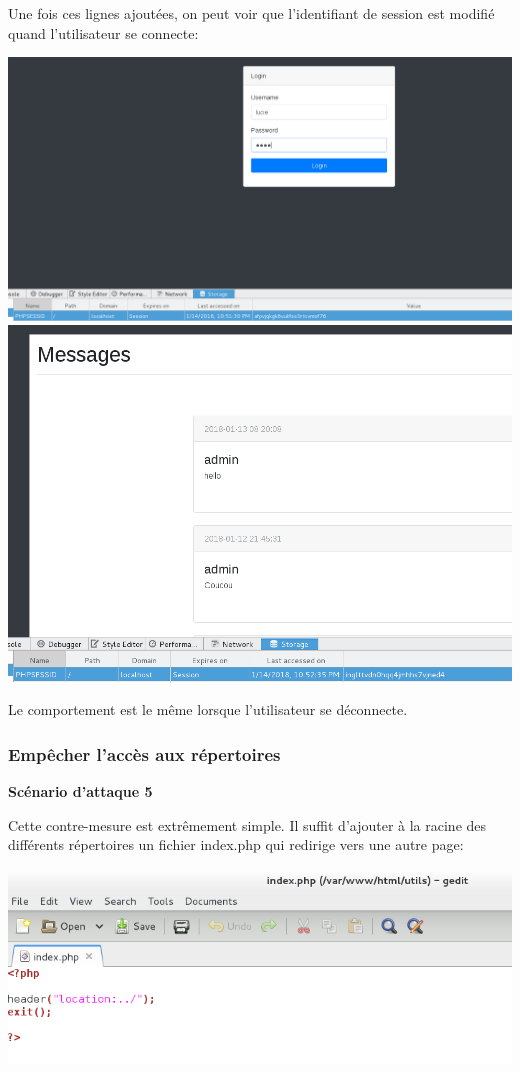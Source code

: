 \documentclass{article}
\begin{document}
Une fois ces lignes ajoutées, on peut voir que l'identifiant de session
est modifié quand l'utilisateur se connecte:

\includegraphics{images/session1.PNG}
\includegraphics{images/session2.PNG}

Le comportement est le même lorsque l'utilisateur se déconnecte.

\subsubsection{Empêcher l'accès aux répertoires}

\textbf{Scénario d'attaque 5}

Cette contre-mesure est extrêmement simple. Il suffit d'ajouter à la
racine des différents répertoires un fichier index.php qui redirige vers
une autre page:

\includegraphics{images/repertoire_fix.PNG}
\end{document}
